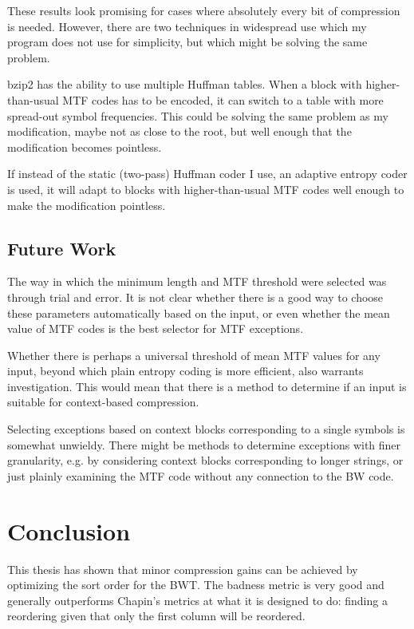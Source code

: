 \documentclass[a4paper]{scrreprt}
\begin{document}
These results look promising for cases where absolutely every bit of compression
is needed. However, there are two techniques in widespread use which my program
does not use for simplicity, but which might be solving the same problem.

bzip2 has the ability to use multiple Huffman tables. When a block with
higher-than-usual MTF codes has to be encoded, it can switch to a table with
more spread-out symbol frequencies. This could be solving the same problem as my
modification, maybe not as close to the root, but well enough that the
modification becomes pointless.

If instead of the static (two-pass) Huffman coder I use, an adaptive entropy
coder is used, it will adapt to blocks with higher-than-usual MTF codes well
enough to make the modification pointless.
\section{Future Work}

The way in which the minimum length and MTF threshold were selected was through
trial and error. It is not clear whether there is a good way to choose these
parameters automatically based on the input, or even whether the mean value of
MTF codes is the best selector for MTF exceptions.

Whether there is perhaps a universal threshold of mean MTF values for any input,
beyond which plain entropy coding is more efficient, also warrants
investigation. This would mean that there is a method to determine if an input
is suitable for context-based compression.

Selecting exceptions based on context blocks corresponding to a single symbols
is somewhat unwieldy. There might be methods to determine exceptions with finer
granularity, e.g. by considering context blocks corresponding to longer strings,
or just plainly examining the MTF code without any connection to the BW code.

\chapter{Conclusion}

This thesis has shown that minor compression gains can be achieved by optimizing
the sort order for the BWT. The badness metric is very good and generally
outperforms Chapin's metrics at what it is designed to do: finding a reordering
given that only the first column will be reordered.
\end{document}
